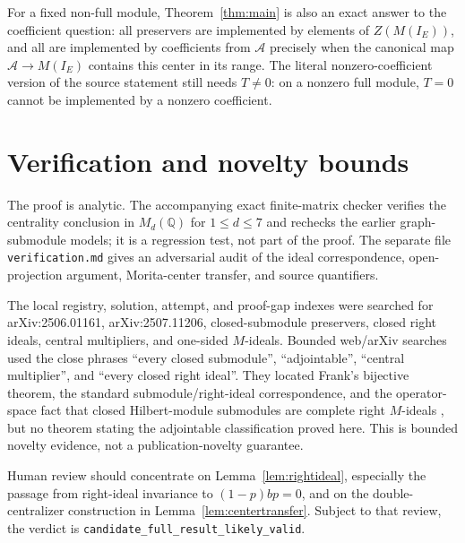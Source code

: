 \documentclass[11pt]{article}
\newcommand{\A}{\mathcal A}
\newcommand{\Icoeff}{I_E}
\begin{document}
For a fixed non-full module, Theorem~\ref{thm:main} is also an exact answer to
the coefficient question: all preservers are implemented by elements of
$Z(M(\Icoeff))$, and all are implemented by coefficients from $\A$ precisely
when the canonical map $\A\to M(\Icoeff)$ contains this center in its range.
The literal nonzero-coefficient version of the source statement still needs
$T\ne0$: on a nonzero full module, $T=0$ cannot be implemented by a nonzero
coefficient.

\section{Verification and novelty bounds}

The proof is analytic.  The accompanying exact finite-matrix checker verifies
the centrality conclusion in $M_d(\mathbb Q)$ for $1\le d\le7$ and rechecks
the earlier graph-submodule models; it is a regression test, not part of the
proof.  The separate file \texttt{verification.md} gives an adversarial audit
of the ideal correspondence, open-projection argument, Morita-center transfer,
and source quantifiers.

The local registry, solution, attempt, and proof-gap indexes were searched for
arXiv:2506.01161, arXiv:2507.11206, closed-submodule preservers, closed right
ideals, central multipliers, and one-sided $M$-ideals.  Bounded web/arXiv
searches used the close phrases ``every closed submodule'', ``adjointable'',
``central multiplier'', and ``every closed right ideal''.  They located
Frank's bijective theorem, the standard submodule/right-ideal correspondence,
and the operator-space fact that closed Hilbert-module submodules are complete
right $M$-ideals \cite{BEZ}, but no theorem stating the adjointable
classification proved here.  This is bounded novelty evidence, not a
publication-novelty guarantee.

Human review should concentrate on Lemma~\ref{lem:rightideal}, especially the
passage from right-ideal invariance to $(1-p)bp=0$, and on the double-centralizer
construction in Lemma~\ref{lem:centertransfer}.  Subject to that review, the
verdict is \texttt{candidate\_full\_result\_likely\_valid}.
\end{document}
